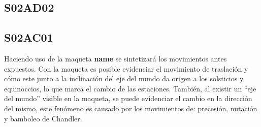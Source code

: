 \documentclass[10pt,a4paper]{article}
\begin{document}
\subsection{S02AD02}


\subsection{S02AC01}
Haciendo uso de la maqueta \textbf{name} se sintetizará los movimientos antes expuestos. Con la maqueta es posible evidenciar el movimiento de traslación y cómo este junto a la inclinación del eje del mundo  da origen a los solsticios y equinoccios, lo que marca el cambio de las estaciones. También, al existir un ``eje del mundo'' visible en la maqueta, se puede evidenciar el cambio en la dirección del mismo, este fenómeno es causado por los movimientos de: precesión, nutación y bamboleo de Chandler.
\end{document}
